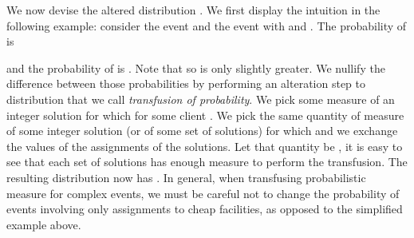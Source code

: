 \documentclass[11pt]{article}
\newtheorem{proposition}{Proposition}[section]
\begin{document}
\begin{comment}
**************************

To estimate the probabilities in question we describe a procedure which produces an assignment-symmetric distribution : fix costly facility . Let  be the number of clients assigned to facility  in each integer solution in  where facility  is opened (this is the average number of assigned clients - for simplicity we may assume (pretend) that this number is the same in every such solution and we assume again w.l.o.g. that  is integer). Let  be the  number of clients assigned to facility  in each integer solution in  where facility  is opened. Likewise, fix costly facility . Let  be the number of clients assigned to facility  in each integer solution in  where facility  is opened and similarly let  be the  number of clients assigned to facility  in each integer solution in  where facility  is opened. The following procedure produce the assignment-symmetric distribution : assign an equal amount of measure  to each integer solution that opens all facilities in  plus facility  and
assigns  clients to each cheap facility and  clients to , so that a total fraction  clients have been assigned (total means summing over all clients). Similarly, for each costly facility  assign an equal amount of measure  to each integer solution that opens all facilities in  plus facility  and
assigns  clients to each cheap facility and  clients to , so that a total fraction  clients have been assigned. The following is straightforward by the construction:

\begin{proposition}
The above procedure produces an assignment-symmetric distribution .
\end{proposition}

***************************

\end{comment}

We now  devise the altered  distribution .  We first  display the
intuition in the following example: consider the event  and the event   with    and  .         The        probability        of                 is

and         the          probability         of                  is
.
Note  that    so    is  only  slightly
greater.  We nullify  the  difference between  those probabilities  by
performing  an alteration  step  to distribution    that we  call
\emph{transfusion of probability}. We  pick some measure of an integer
solution    for which    for some  client .  We pick  the same  quantity of
measure of some  integer solution (or of some  set of solutions) 
for which   and
we exchange the values of the assignments  of the solutions.
  Let that quantity be , it is easy to
see  that each  set of  solutions has  enough measure  to  perform the
transfusion. The resulting distribution   now has . In
general, when transfusing probabilistic measure for complex events, we
must be  careful not  to change the  probability of  events involving
only  assignments to cheap facilities, as opposed to the simplified
example above.
\end{document}
